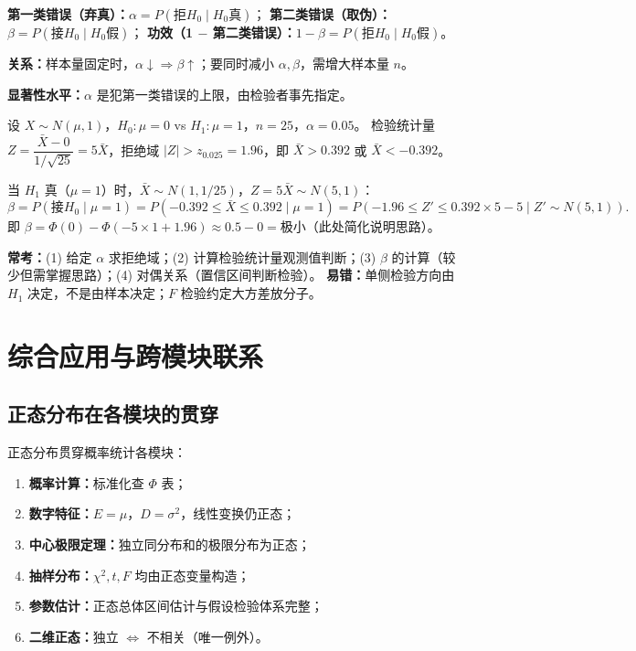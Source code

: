 \documentclass[11pt,a4paper]{article}
\begin{document}
\begin{variation}[两类错误的关系]
\textbf{第一类错误（弃真）：}$\alpha=P(\text{拒}H_0\mid H_0\text{真})$；
\textbf{第二类错误（取伪）：}$\beta=P(\text{接}H_0\mid H_0\text{假})$；
\textbf{功效（1 $-$ 第二类错误）：}$1-\beta=P(\text{拒}H_0\mid H_0\text{假})$。

\textbf{关系：}样本量固定时，$\alpha\downarrow \Rightarrow \beta\uparrow$；要同时减小 $\alpha,\beta$，需增大样本量 $n$。

\textbf{显著性水平：}$\alpha$ 是犯第一类错误的上限，由检验者事先指定。
\end{variation}

\begin{derivation}
设 $X\sim N(\mu,1)$，$H_0:\mu=0$ vs $H_1:\mu=1$，$n=25$，$\alpha=0.05$。
检验统计量 $Z=\dfrac{\bar X-0}{1/\sqrt{25}}=5\bar X$，拒绝域 $|Z|>z_{0.025}=1.96$，即 $\bar X>0.392$ 或 $\bar X<-0.392$。

当 $H_1$ 真（$\mu=1$）时，$\bar X\sim N(1, 1/25)$，$Z=5\bar X\sim N(5,1)$：
\[
\beta = P(\text{接}H_0\mid \mu=1) = P(-0.392\leq \bar X\leq 0.392\mid \mu=1) = P(-1.96\leq Z'\leq 0.392\times 5 - 5\mid Z'\sim N(5,1)).
\]
即 $\beta=\Phi(0)-\Phi(-5\times 1+1.96)\approx 0.5-0=\text{极小}$（此处简化说明思路）。
\end{derivation}

\begin{examtip}[考研重点]
\textbf{常考：}(1) 给定 $\alpha$ 求拒绝域；(2) 计算检验统计量观测值判断；(3) $\beta$ 的计算（较少但需掌握思路）；(4) 对偶关系（置信区间判断检验）。
\textbf{易错：}单侧检验方向由 $H_1$ 决定，不是由样本决定；$F$ 检验约定大方差放分子。
\end{examtip}

\section{综合应用与跨模块联系}

\subsection{正态分布在各模块的贯穿}

\begin{keypoint}[正态分布的核心地位]
正态分布贯穿概率统计各模块：
\begin{enumerate}[leftmargin=2em]
  \item \textbf{概率计算：}标准化查 $\Phi$ 表；
  \item \textbf{数字特征：}$E=\mu$，$D=\sigma^2$，线性变换仍正态；
  \item \textbf{中心极限定理：}独立同分布和的极限分布为正态；
  \item \textbf{抽样分布：}$\chi^2,t,F$ 均由正态变量构造；
  \item \textbf{参数估计：}正态总体区间估计与假设检验体系完整；
  \item \textbf{二维正态：}独立 $\iff$ 不相关（唯一例外）。
\end{enumerate}
\end{keypoint}
\end{document}
